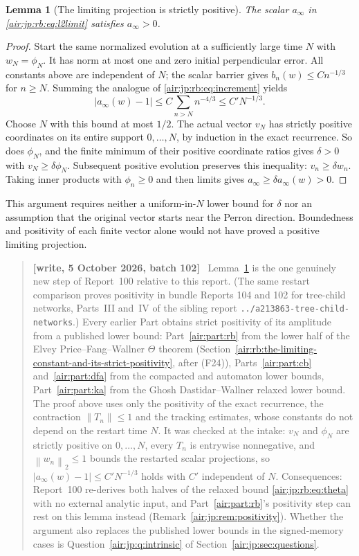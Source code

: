 \documentclass[11pt,letterpaper]{article}
\numberwithin{equation}{section}
\newtheorem{lemma}[theorem]{Lemma}
\theoremstyle{remark}
\newcommand{\norm}[1]{\left\lVert#1\right\rVert}
\newenvironment{writenotejp}{\par\smallskip\begin{quote}\small\textbf{[write, 5 October 2026, batch 102]}\ }{\end{quote}\smallskip}
\newcommand{\repopath}[1]{\nolinkurl{#1}}
\begin{document}
\begin{lemma}[The limiting projection is strictly positive]\label{air:jp:rb:lem:positive}
The scalar $a_\infty$ in \eqref{air:jp:rb:eq:l2limit} satisfies $a_\infty>0$.
\end{lemma}
\begin{proof}
Start the same normalized evolution at a sufficiently large time $N$ with $w_N=\phi_N$. It has norm at most one and zero initial perpendicular error. All constants above are independent of $N$; the scalar barrier gives $b_n(w)\le Cn^{-1/3}$ for $n\ge N$. Summing the analogue of \eqref{air:jp:rb:eq:increment} yields
\[
 |a_\infty(w)-1|\le C\sum_{n>N}n^{-4/3}\le C'N^{-1/3}.
\]
Choose $N$ with this bound at most $1/2$. The actual vector $v_N$ has strictly positive coordinates on its entire support $0,\ldots,N$, by induction in the exact recurrence. So does $\phi_N$, and the finite minimum of their positive coordinate ratios gives $\delta>0$ with $v_N\ge\delta\phi_N$. Subsequent positive evolution preserves this inequality: $v_n\ge\delta w_n$. Taking inner products with $\phi_n\ge0$ and then limits gives $a_\infty\ge\delta a_\infty(w)>0$.
\end{proof}
This argument requires neither a uniform-in-$N$ lower bound for $\delta$ nor an assumption that the original vector starts near the Perron direction. Boundedness and positivity of each finite vector alone would not have proved a positive limiting projection.
\begin{writenotejp}
Lemma~\ref{air:jp:rb:lem:positive} is the one genuinely new step of Report~100 relative to this report. (The same restart comparison proves positivity in bundle Reports 104 and 102 for tree-child networks, Parts~III and~IV of the sibling report \repopath{../a213863-tree-child-networks}.) Every earlier Part obtains strict positivity of its amplitude from a published lower bound: Part~\ref{air:part:rb} from the lower half of the Elvey Price--Fang--Wallner $\Theta$ theorem (Section~\ref{air:rb:the-limiting-constant-and-its-strict-positivity}, after (F24)), Parts~\ref{air:part:cb} and~\ref{air:part:dfa} from the compacted and automaton lower bounds, Part~\ref{air:part:ka} from the Ghosh Dastidar--Wallner relaxed lower bound. The proof above uses only the positivity of the exact recurrence, the contraction $\norm{T_n}\le1$ and the tracking estimates, whose constants do not depend on the restart time $N$. It was checked at the intake: $v_N$ and $\phi_N$ are strictly positive on $0,\ldots,N$, every $T_n$ is entrywise nonnegative, and $\norm{w_n}_2\le1$ bounds the restarted scalar projections, so $|a_\infty(w)-1|\le C'N^{-1/3}$ holds with $C'$ independent of $N$. Consequences: Report~100 re-derives both halves of the relaxed bound \eqref{air:jp:rb:eq:theta} with no external analytic input, and Part~\ref{air:part:rb}'s positivity step can rest on this lemma instead (Remark~\ref{air:jp:rem:positivity}). Whether the argument also replaces the published lower bounds in the signed-memory cases is Question~\ref{air:jp:q:intrinsic} of Section~\ref{air:jp:sec:questions}.
\end{writenotejp}
\end{document}
